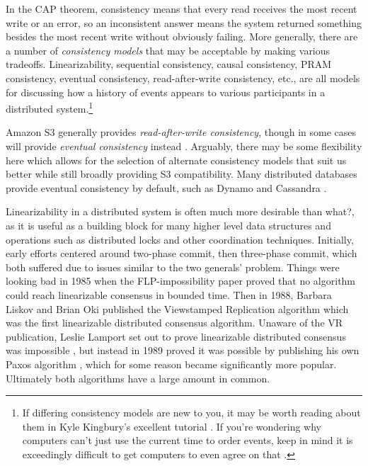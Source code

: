 \documentclass[11pt,fleqn,openany]{book}
\newcommand{\bs}[1]{{\color{red}#1}}
\begin{document}
In the CAP theorem, consistency means that every read receives the most recent
write or an error, so an inconsistent answer means the system returned something
besides the most recent write without obviously failing. More generally, there
are a number of {\em consistency models} that may be acceptable by making
various tradeoffs. Linearizability, sequential consistency, causal consistency,
PRAM consistency, eventual consistency, read-after-write consistency, etc., are
all models for discussing how a history of events appears to various
participants in a distributed system.\footnote{If differing consistency models
are new to you, it may be worth reading about them in Kyle Kingbury's excellent
tutorial \cite{aphyr-consistency}. If you're wondering why computers can't just
use the current time to order events, keep in mind it is exceedingly difficult
to get computers to even agree on that \cite{no-now}.}

Amazon S3 generally provides {\em read-after-write consistency}, though in some
cases will provide {\em eventual consistency} instead \cite{s3-consistency}.
Arguably, there may be some flexibility here which allows for the selection
of alternate consistency models that suit us better while still broadly
providing S3 compatibility.
Many distributed databases provide eventual consistency by
default, such as Dynamo \cite{dynamo} and Cassandra \cite{cassandra}.

Linearizability in a distributed system is often much more desirable
\bs{than what?}, as it is
useful as a building block for many higher level data structures and operations
such as distributed locks and other coordination techniques. Initially, early
efforts centered around two-phase commit, then three-phase commit, which both
suffered due to issues similar to the two generals' problem. Things were looking
bad in 1985 when the FLP-impossibility paper \cite{flp} proved that no algorithm
could reach linearizable consensus in bounded time. Then in 1988, Barbara Liskov
and Brian Oki published the Viewstamped Replication algorithm \cite{vr} which
was the first linearizable distributed consensus algorithm. Unaware of the VR
publication, Leslie Lamport set out to prove linearizable distributed consensus
was impossible \cite{paxos-note}, but instead in 1989 proved it was possible by
publishing his own Paxos algorithm \cite{paxos}, which for some reason became
significantly more popular. Ultimately both algorithms have a large amount in
common.
\end{document}
